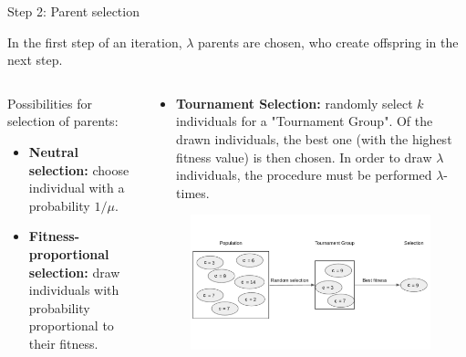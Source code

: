 \begin{frame}{Step 2: Parent selection}


In the first step of an iteration, $\lambda$ parents are chosen, who create offspring in the next step.


\begin{columns}
\begin{column}{0.5\textwidth}

  Possibilities for selection of parents:

  \begin{itemize}
    \item \textbf{Neutral selection: }choose individual with a probability $1/\mu$.
    \item \textbf{Fitness-proportional selection: }draw individuals with probability proportional to their fitness.
  \end{itemize}
\end{column}%
\begin{column}{0.5\textwidth}
  \begin{itemize}
    \item \textbf{Tournament Selection: }randomly select $k$ individuals for a "Tournament Group". Of the drawn individuals, the best one (with the highest fitness value) is then chosen. In order to draw $\lambda$ individuals, the procedure must be performed $\lambda$-times.
  \end{itemize}

  \begin{figure}
    \includegraphics[width = 0.9\linewidth]{images/tournament_selection_c.pdf}
  \end{figure}

\end{column}
\end{columns}

\end{frame}

